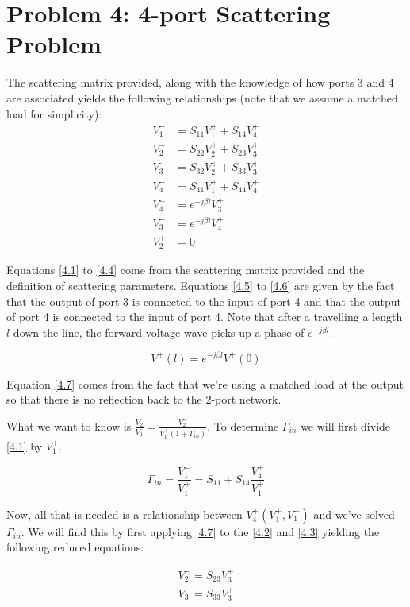 \section{Problem 4: 4-port Scattering Problem}
\setcounter{equation}{0}
\addtocounter{section}{1}
The scattering matrix provided, along with the knowledge of how ports 3 and 4
are associated yields the following relationships (note that we assume a matched
load for simplicity):
\begin{align}
    V_1^- &= S_{11}V_1^+ + S_{14}V_4^+ \label{4.1} \\
    V_2^- &= S_{22}V_2^+ + S_{23}V_3^+ \label{4.2} \\
    V_3^- &= S_{32}V_2^+ + S_{33}V_3^+ \label{4.3} \\
    V_4^- &= S_{41}V_1^+ + S_{44}V_4^+ \label{4.4} \\
    V_4^- &= e^{-j \beta l} V_3^+ \label{4.5}\\
    V_3^- &= e^{-j \beta l} V_4^+ \label{4.6} \\
    V_2^+ &= 0  \label{4.7}
\end{align}

Equations \ref{4.1} to \ref{4.4} come from the scattering matrix provided and
the definition of scattering parameters. Equations \ref{4.5} to \ref{4.6} are
given by the fact that the output of port 3 is connected to the input of port 4
and that the output of port 4 is connected to the input of port 4. Note that
after a travelling a length $l$ down the line, the forward voltage wave picks up
a phase of $e^{-j \beta l}$.

\[ 
        V^+(l) = e^{-j \beta l} V^+(0)
\]

Equation \ref{4.7} comes from the fact that we're using a matched load at the
output so that there is no reflection back to the 2-port network.

What we want to know is $\frac{V_2}{V_1} = \frac{V_2^-}{V_1^+(1+\Gamma_{in})}$.
To determine $\Gamma_{in}$ we will first divide \ref{4.1} by $V_1^+$.

\[ 
        \Gamma_{in} = \frac{V_1^-}{V_1^+} = S_{11} + S_{14}\frac{V_4^+}{V_1^+}
\]

Now, all that is needed is a relationship between $V_4^+(V_1^+,V_1^-)$ and we've
solved $\Gamma_{in}$. We will find this by first applying \ref{4.7} to the
\ref{4.2} and \ref{4.3} yielding the following reduced equations:

\begin{align}
    V_2^- = S_{23} V_3^+ \\
    V_3^- = S_{33} V_3^+ \label{v3rel}
\end{align}

